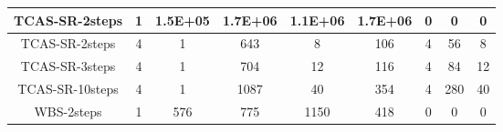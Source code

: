 \begin{table*}[]
\begin{tabular}{@{}ccccccccc@{}}
        TCAS-SR-2steps                                              & 1                                                            & 1.5E+05                                                    & 1.7E+06                                                     & 1.1E+06                                                        & 1.7E+06                                                        & 0                                                          & 0                                                             & 0        \\ \midrule
        TCAS-SR-2steps                                              & 4                                                            & 1                                                          & 643                                                         & 8                                                              & 106                                                            & 4                                                          & 56                                                            & 8        \\ \midrule
        TCAS-SR-3steps                                              & 4                                                            & 1                                                          & 704                                                         & 12                                                             & 116                                                            & 4                                                          & 84                                                            & 12       \\ \midrule
        TCAS-SR-10steps                                             & 4                                                            & 1                                                          & 1087                                                        & 40                                                             & 354                                                            & 4                                                          & 280                                                           & 40       \\ \midrule
        WBS-2steps                                                  & 1                                                            & 576                                                        & 775                                                         & 1150                                                           & 418                                                            & 0                                                          & 0                                                             & 0        \\ \midrule

\end{tabular}
\end{table*}
